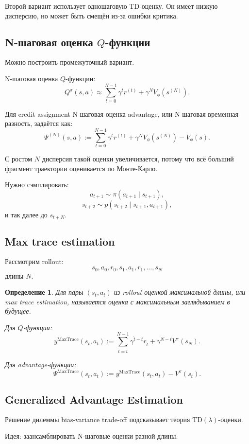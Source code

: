 \documentclass[12pt,a4paper]{article}
\newtheorem{definition}{Определение}
\begin{document}
Второй вариант использует одношаговую TD-оценку. Он имеет низкую дисперсию, но может быть смещён из-за ошибки критика.

\subsection{N-шаговая оценка $Q$-функции}

Можно построить промежуточный вариант.

N-шаговая оценка $Q$-функции:
\[
Q^\pi(s,a)
\approx
\sum_{t=0}^{N-1}
\gamma^t r^{(t)}
+
\gamma^N
V_\phi(s^{(N)}).
\]

Для credit assignment N-шаговая оценка advantage, или N-шаговая временная разность, задаётся как:
\[
\Psi^{(N)}(s,a)
:=
\sum_{t=0}^{N-1}
\gamma^t r^{(t)}
+
\gamma^N
V_\phi(s^{(N)})
-
V_\phi(s).
\]

С ростом $N$ дисперсия такой оценки увеличивается, потому что всё больший фрагмент траектории оценивается по Монте-Карло.

Нужно сэмплировать:
\[
a_{t+1}\sim\pi(a_{t+1}\mid s_{t+1}),
\]
\[
s_{t+2}\sim p(s_{t+2}\mid s_{t+1},a_{t+1}),
\]
и так далее до $s_{t+N}$.

\subsection{Max trace estimation}

Рассмотрим rollout:
\[
s_0,a_0,r_0,s_1,a_1,r_1,\ldots,s_N
\]
длины $N$.

\begin{definition}
Для пары $(s_t,a_t)$ из rollout оценкой максимальной длины, или max trace estimation, называется оценка с максимальным заглядыванием в будущее.

Для $Q$-функции:
\[
y^{\mathrm{MaxTrace}}(s_t,a_t)
:=
\sum_{\hat t=t}^{N-1}
\gamma^{\hat t-t}
r_{\hat t}
+
\gamma^{N-t}
V^\pi(s_N).
\]

Для advantage-функции:
\[
\Psi^{\mathrm{MaxTrace}}(s_t,a_t)
:=
y^{\mathrm{MaxTrace}}(s_t,a_t)
-
V^\pi(s_t).
\]
\end{definition}

\subsection{Generalized Advantage Estimation}

Решение дилеммы bias-variance trade-off подсказывает теория TD$(\lambda)$-оценки.

Идея: заансамблировать N-шаговые оценки разной длины.
\end{document}
